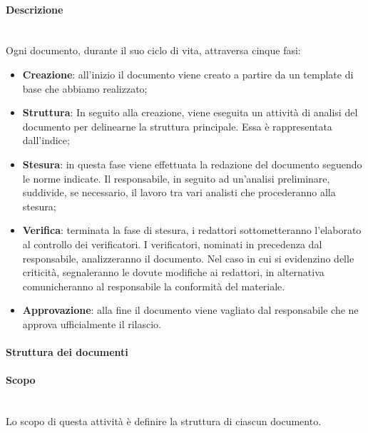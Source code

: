 	        \paragraph*{Descrizione}\mbox{}\\ [1mm]
            Ogni documento, durante il suo ciclo di vita, attraversa cinque fasi:
            \begin{itemize}
            	\item \textbf{Creazione}: all'inizio il documento viene creato a partire da un template di base che abbiamo realizzato;
            	\item \textbf{Struttura}: In seguito alla creazione, viene eseguita un attività di analisi del documento per delinearne la struttura principale. Essa è rappresentata dall'indice;
                \item \textbf{Stesura}: in questa fase viene effettuata la redazione del documento seguendo le norme indicate. Il responsabile, in seguito ad un'analisi preliminare, suddivide, se necessario, il lavoro tra vari analisti che procederanno alla stesura;
                \item \textbf{Verifica}: terminata la fase di stesura, i redattori sottometteranno l'elaborato al controllo dei verificatori. I verificatori, 
                                         nominati in precedenza dal responsabile, analizzeranno il documento. Nel caso in cui si evidenzino delle criticità,
                                         segnaleranno le dovute modifiche ai redattori, in alternativa comunicheranno al responsabile la conformità del materiale.
                \item \textbf{Approvazione}: alla fine il documento viene vagliato dal responsabile che ne approva ufficialmente il rilascio.
            \end{itemize}
        \paragraph{Struttura dei documenti}
			\paragraph*{Scopo}\mbox{}\\ [1mm]
			Lo scopo di questa attività è definire la struttura di ciascun documento.
			
